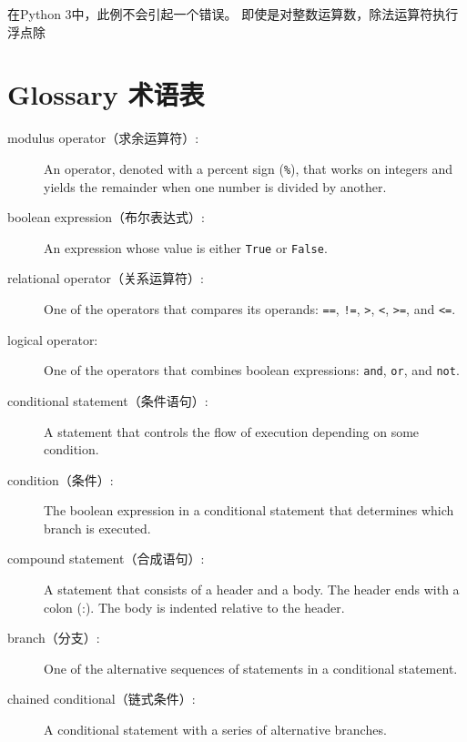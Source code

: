 \documentclass[10pt]{book}
\begin{document}
\begin{CJK}{UTF8}{gbsn}
在Python 3中，此例不会引起一个错误。
即使是对整数运算数，除法运算符执行浮点除


\section{Glossary 术语表}

\begin{description}

\item[modulus operator（求余运算符）:]  An operator, denoted with a percent sign
({\tt \%}), that works on integers and yields the remainder when one
number is divided by another.

\item[boolean expression（布尔表达式）:]  An expression whose value is either 
{\tt True} or {\tt False}.

\item[relational operator（关系运算符）:] One of the operators that compares
its operands: {\tt ==}, {\tt !=}, {\tt >}, {\tt <}, {\tt >=}, and {\tt <=}.

\item[logical operator:] One of the operators that combines boolean
expressions: {\tt and}, {\tt or}, and {\tt not}.

\item[conditional statement（条件语句）:]  A statement that controls the flow of
execution depending on some condition.

\item[condition（条件）:] The boolean expression in a conditional statement
that determines which branch is executed.

\item[compound statement（合成语句）:]  A statement that consists of a header
and a body.  The header ends with a colon (:).  The body is indented
relative to the header.

\item[branch（分支）:] One of the alternative sequences of statements in
a conditional statement.

\item[chained conditional（链式条件）:]  A conditional statement with a series
of alternative branches.


\end{description}
\end{CJK}
\end{document}

